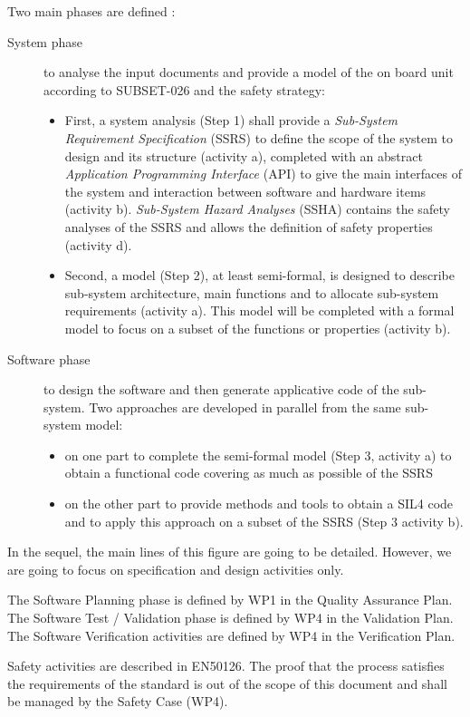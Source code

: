Two main phases are defined :
\begin{description}
\item[System phase] to analyse the input documents and provide a model of the on
  board unit according to SUBSET-026 and the safety strategy:
\begin{itemize}
\item First, a system analysis (Step 1) shall provide a \textit{Sub-System Requirement Specification} (SSRS) to define the scope of the system to  design and its structure (activity a), completed with an abstract \textit{Application Programming Interface} (API) to  give the main interfaces of the system and interaction between software and hardware items (activity b). \textit{Sub-System Hazard Analyses} (SSHA) contains the safety analyses of the SSRS and  allows the definition of safety properties (activity d).
\item Second, a model (Step 2), at least semi-formal, is designed to describe sub-system
  architecture, main functions and to allocate sub-system requirements (activity a). This
  model will be completed with a formal model to focus on a subset of the
  functions or properties (activity b).
\end{itemize}
\item[Software phase] to design the software and then generate applicative code
  of the sub-system. Two approaches are developed in parallel from the same
  sub-system model:
\begin{itemize}
\item on one part to complete the semi-formal model (Step 3, activity a) to obtain a functional code covering as much as possible of the SSRS
\item on the other part to provide methods and tools to  obtain a SIL4 code and to apply this approach on a subset of the SSRS (Step 3 activity b).
\end{itemize}
\end{description} 

In the sequel, the main lines of this figure are going to be detailed. However, we are going to focus on specification and design activities only.

The Software Planning phase is defined by WP1 in the Quality Assurance Plan.
The Software Test / Validation phase is defined by WP4 in the Validation Plan.
The Software Verification activities are defined by WP4 in the Verification Plan.

Safety activities are described in EN50126.
The proof that the process satisfies the requirements of the standard is out of the scope of this document and shall be managed by the Safety Case (WP4).



